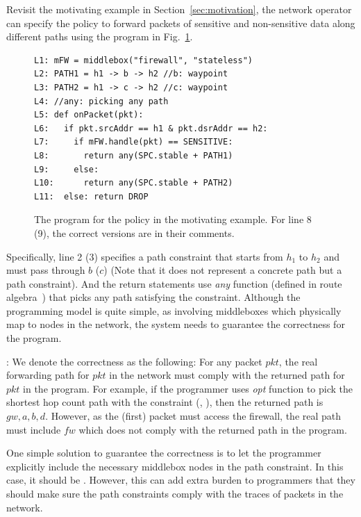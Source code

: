  Revisit the motivating example in Section~\ref{sec:motivation}, the network
operator can specify the policy to forward packets of sensitive and non-sensitive data along different paths using the \concept{} program in Fig.~\ref{fig:code}.

\begin{figure}[h]
\begin{scriptsize}
\begin{verbatim}
L1: mFW = middlebox("firewall", "stateless")
L2: PATH1 = h1 -> b -> h2 //b: waypoint
L3: PATH2 = h1 -> c -> h2 //c: waypoint
L4: //any: picking any path
L5: def onPacket(pkt):
L6:   if pkt.srcAddr == h1 & pkt.dsrAddr == h2:
L7:     if mFW.handle(pkt) == SENSITIVE:
L8:       return any(SPC.stable + PATH1)
L9:     else:
L10:      return any(SPC.stable + PATH2)
L11:  else: return DROP
\end{verbatim}
\end{scriptsize}
	\caption{\small The \concept{} program for the policy in the motivating example. For line 8 (9), the correct versions are in their comments.}
\label{fig:code}
\end{figure}

Specifically, line 2 (3) specifies a path constraint that starts from $h_1$ to $h_2$ and must pass through $b$ ($c$) (Note that it does not represent a concrete path but a path constraint). And the return statements use \emph{any} function (defined in route algebra~\cite{gao2018t}) that picks any path satisfying the constraint. Although the programming model is quite simple, as involving middleboxes which physically map to nodes in the network, the system needs to guarantee the correctness for the program.

: We denote the correctness as the following: For any packet $pkt$, the real forwarding path for $pkt$ in the network must comply with the returned path for $pkt$ in the program. For example, if the programmer uses \emph{opt} function to pick the shortest hop count path with the constraint (\ie, ), then the returned path is $gw, a, b, d$. However, as the (first) packet must access the firewall, the real path must include $fw$ which does not comply with the returned path in the program.

One simple solution to guarantee the correctness is to let the programmer explicitly include the necessary middlebox nodes in the path constraint. In this case, it should be . However, this can add extra burden to programmers that they should make sure the path constraints comply with the traces of packets in the network.

